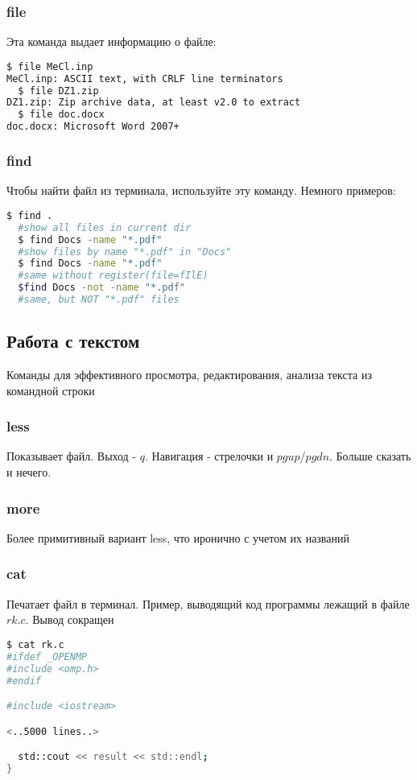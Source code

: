 \documentclass[11pt]{article}
\begin{document}
\subsubsection*{file}
Эта команда выдает информацию о файле:
\begin{lstlisting}[language=bash]
  $ file MeCl.inp 
MeCl.inp: ASCII text, with CRLF line terminators
  $ file DZ1.zip 
DZ1.zip: Zip archive data, at least v2.0 to extract
  $ file doc.docx 
doc.docx: Microsoft Word 2007+
\end{lstlisting}

\subsubsection*{find}

Чтобы найти файл из терминала, используйте эту команду. Немного примеров:
\begin{lstlisting}[language=bash]
  $ find .                    
  #show all files in current dir
  $ find Docs -name "*.pdf"   
  #show files by name "*.pdf" in "Docs"
  $ find Docs -name "*.pdf"   
  #same without register(file=fIlE)
  $find Docs -not -name "*.pdf"   
  #same, but NOT "*.pdf" files
\end{lstlisting}


\subsection*{Работа с текстом}
Команды для эффективного просмотра, редактирования, анализа текста из командной строки
\subsubsection*{less}
Показывает файл. Выход - $q$. Навигация - стрелочки и $pg up$/$pg dn$. Больше сказать и нечего.

\subsubsection*{more}
Более примитивный вариант less, что иронично с учетом их названий
\subsubsection*{cat}
Печатает файл в терминал. Пример, выводящий код программы лежащий в файле $rk.c$. Вывод сокращен
\begin{lstlisting}[language=bash]
$ cat rk.c
#ifdef _OPENMP
#include <omp.h>
#endif

#include <iostream>

<..5000 lines..>

  std::cout << result << std::endl;
}
\end{lstlisting}
\end{document}
